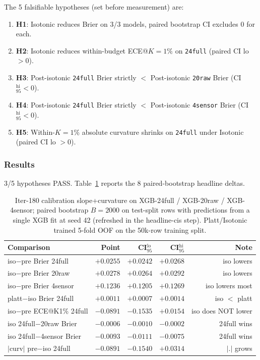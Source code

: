 \documentclass{article}
\begin{document}
The 5 falsifiable hypotheses (set before measurement) are:
\begin{enumerate}
\item \textbf{H1}: Isotonic reduces Brier on 3/3 models, paired bootstrap
  CI excludes 0 for each.
\item \textbf{H2}: Isotonic reduces within-budget ECE@$K{=}1\%$ on
  \texttt{24full} (paired CI lo $> 0$).
\item \textbf{H3}: Post-isotonic \texttt{24full} Brier strictly $<$
  Post-isotonic \texttt{20raw} Brier (CI$_{95}^{\mathrm{hi}} < 0$).
\item \textbf{H4}: Post-isotonic \texttt{24full} Brier strictly $<$
  Post-isotonic \texttt{4sensor} Brier (CI$_{95}^{\mathrm{hi}} < 0$).
\item \textbf{H5}: Within-$K{=}1\%$ absolute curvature shrinks on
  \texttt{24full} under Isotonic (paired CI lo $> 0$).
\end{enumerate}

\subsubsection{Results}\label{sec:p8-iter180-results}

3/5 hypotheses PASS. Table~\ref{tab:p8-iter180-headline} reports the
8 paired-bootstrap headline deltas.

\begin{table}[h]
\centering\small
\caption{Iter-180 calibration slope+curvature on XGB-24full /
XGB-20raw / XGB-4sensor; paired bootstrap $B{=}2000$ on test-split
rows with predictions from a single XGB fit at seed 42 (refreshed
in the headline-cis step). Platt/Isotonic trained 5-fold OOF on the
50k-row training split.}
\label{tab:p8-iter180-headline}
\begin{tabular}{lrrrr}
\hline
Comparison & Point & CI$_{95}^{\mathrm{lo}}$ & CI$_{95}^{\mathrm{hi}}$ & Note \\
\hline
iso$-$pre Brier 24full & $+0.0255$ & $+0.0242$ & $+0.0268$ & iso lowers \\
iso$-$pre Brier 20raw  & $+0.0278$ & $+0.0264$ & $+0.0292$ & iso lowers \\
iso$-$pre Brier 4sensor & $+0.1236$ & $+0.1205$ & $+0.1269$ & iso lowers most \\
platt$-$iso Brier 24full & $+0.0011$ & $+0.0007$ & $+0.0014$ & iso $<$ platt \\
iso$-$pre ECE@K1\% 24full & $-0.0891$ & $-0.1535$ & $+0.0154$ & iso does NOT lower \\
iso 24full$-$20raw Brier & $-0.0006$ & $-0.0010$ & $-0.0002$ & 24full wins \\
iso 24full$-$4sensor Brier & $-0.0093$ & $-0.0111$ & $-0.0075$ & 24full wins \\
$|$curv$|$ pre$-$iso 24full & $-0.0891$ & $-0.1540$ & $+0.0314$ & $|.|$ grows \\
\hline
\end{tabular}
\end{table}
\end{document}

